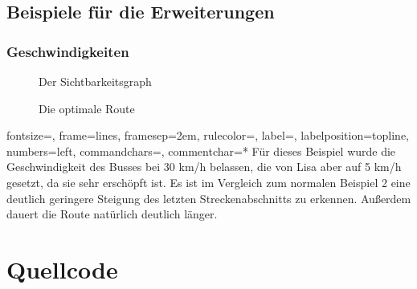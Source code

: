 \documentclass[a4paper, notitlepage, 12pt]{scrartcl}
\begin{document}
\subsection{Beispiele für die Erweiterungen}
\subsubsection*{Geschwindigkeiten}
\begin{minipage}[b]{0.45\linewidth}
	\begin{figure}[H]
		
		\caption{Der Sichtbarkeitsgraph}
	\end{figure}
\end{minipage}
\hspace{0.5cm}
\begin{minipage}[b]{0.45\linewidth}
	\begin{figure}[H] 
		\caption{Die optimale Route}
	\end{figure}
\end{minipage}
%
{fontsize=\footnotesize,
	frame=lines,  %
	framesep=2em, %
	rulecolor=\color{Gray},
	label=,
	labelposition=topline,
	numbers=left,
	commandchars=\|\(\), %
	commentchar=*        %
}
Für dieses Beispiel wurde die Geschwindigkeit des Busses bei 30 km/h belassen, die von Lisa aber auf 5 km/h gesetzt, da sie sehr erschöpft ist. Es ist im Vergleich zum normalen Beispiel 2 eine deutlich geringere Steigung des letzten Streckenabschnitts zu erkennen. Außerdem dauert die Route natürlich deutlich länger.
\newpage
 \section{Quellcode}
 \renewcommand{\listingscaption}{Quellcode}
 
\end{document}
